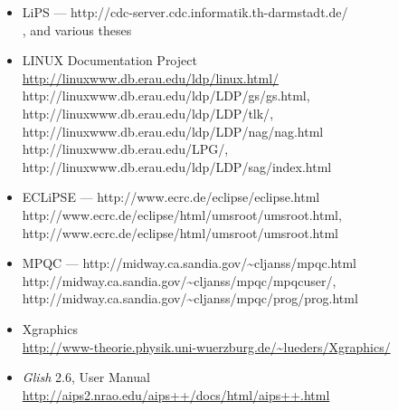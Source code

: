 \begin{description}
\begin{itemize}
\item 
LiPS --- 
{http://cdc-server.cdc.informatik.th-darmstadt.de/}\\
, 
and various theses
\html{\smallskip}%

\item
LINUX Documentation Project\\
\url{http://linuxwww.db.erau.edu/ldp/linux.html/}\\
%
{http://linuxwww.db.erau.edu/ldp/LDP/gs/gs.html}, 
%
{http://linuxwww.db.erau.edu/ldp/LDP/tlk/}, 
%
{http://linuxwww.db.erau.edu/ldp/LDP/nag/nag.html}\\
%
{http://linuxwww.db.erau.edu/LPG/}, 
%
{http://linuxwww.db.erau.edu/ldp/LDP/sag/index.html}
\html{\smallskip}%

\item
ECLiPSE --- %
{http://www.ecrc.de/eclipse/eclipse.html}\\
%
{http://www.ecrc.de/eclipse/html/umsroot/umsroot.html}, 
%
{http://www.ecrc.de/eclipse/html/umsroot/umsroot.html}
\html{\smallskip}%

\item
MPQC --- 
{http://midway.ca.sandia.gov/\~{}cljanss/mpqc.html}\\
%
{http://midway.ca.sandia.gov/\~{}cljanss/mpqc/mpqcuser/}, 
%
{http://midway.ca.sandia.gov/\~{}cljanss/mpqc/prog/prog.html}
\html{\smallskip}%

\item
Xgraphics\\
\url{http://www-theorie.physik.uni-wuerzburg.de/~lueders/Xgraphics/}
\html{\smallskip}%

\item
\textit{Glish} 2.6, User Manual\\
\url{http://aips2.nrao.edu/aips++/docs/html/aips++.html}
\html{\smallskip}%


\end{itemize}
\end{description}

